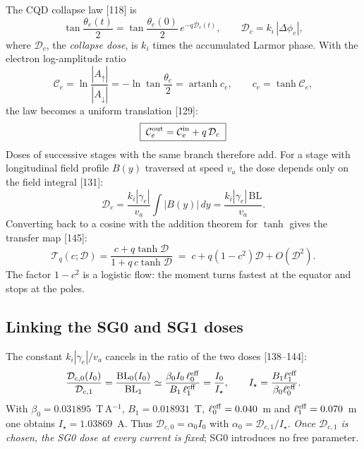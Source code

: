 \documentclass[11pt,a4paper]{article}
\newcommand{\D}{\mathcal{D}}
\newcommand{\C}{\mathcal{C}}
\newcommand{\T}{\mathcal{T}}
\newcommand{\BL}{\mathrm{BL}}
\begin{document}
The CQD collapse law [118] is
\begin{equation}
\tan\frac{\theta_e(t)}2=\tan\frac{\theta_e(0)}2\,e^{-q\D_c(t)},\qquad \D_c=k_i\,|\Delta\phi_e|,
\end{equation}
where $\D_c$, the \emph{collapse dose}, is $k_i$ times the accumulated Larmor phase. With the electron
log-amplitude ratio
\begin{equation}
\C_e=\ln\frac{|A_\uparrow|}{|A_\downarrow|}=-\ln\tan\frac{\theta_e}{2}=\operatorname{artanh}c_e,
\qquad c_e=\tanh\C_e,
\end{equation}
the law becomes a uniform translation [129]:
\begin{equation}
\boxed{\;\C_e^{\rm out}=\C_e^{\rm in}+q\,\D_c\;}
\end{equation}
Doses of successive stages with the same branch therefore add. For a stage with longitudinal field
profile $B(y)$ traversed at speed $v_a$ the dose depends only on the field integral [131]:
\begin{equation}
\D_c=\frac{k_i|\gamma_e|}{v_a}\int|B(y)|\,dy=\frac{k_i|\gamma_e|\,\BL}{v_a}.
\end{equation}
Converting back to a cosine with the addition theorem for $\tanh$ gives the transfer map [145]:
\begin{equation}
\T_q(c;\D)=\frac{c+q\tanh\D}{1+q\,c\tanh\D}\;=\;c+q(1-c^2)\D+O(\D^2).
\end{equation}
The factor $1-c^2$ is a logistic flow: the moment turns fastest at the equator and stops at the poles.

\subsection{Linking the SG0 and SG1 doses}

The constant $k_i|\gamma_e|/v_a$ cancels in the ratio of the two doses [138--144]:
\begin{equation}
\frac{\D_{c,0}(I_0)}{\D_{c,1}}=\frac{\BL_0(I_0)}{\BL_1}
\simeq\frac{\beta_0I_0\,\ell_0^{\rm eff}}{B_1\,\ell_1^{\rm eff}}
=\frac{I_0}{I_\star},\qquad
I_\star=\frac{B_1\ell_1^{\rm eff}}{\beta_0\ell_0^{\rm eff}} .
\label{eq:link}
\end{equation}
With $\beta_0=0.031895$~T\,A$^{-1}$, $B_1=0.018931$~T, $\ell_0^{\rm eff}=0.040$~m and
$\ell_1^{\rm eff}=0.070$~m one obtains $I_\star=1.03869$~A. Thus $\D_{c,0}=\alpha_0I_0$ with
$\alpha_0=\D_{c,1}/I_\star$. \emph{Once $\D_{c,1}$ is chosen, the SG0 dose at every current is fixed};
SG0 introduces no free parameter.
\end{document}
